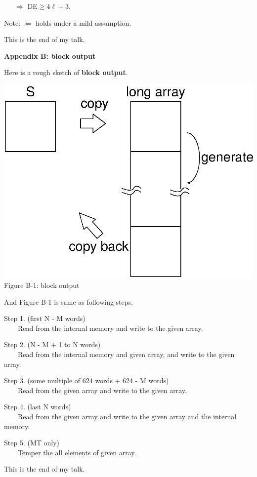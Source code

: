 \documentclass[a4j,12pt,landscape]{jarticle}
\begin{document}
~~~$\Rightarrow$ DE$\geq 4\ell +3$. 

Note: $\Leftarrow$ holds under a mild assumption.

\vskip 1cm
\begin{center}
This is the end of my talk.
\end{center}

\newpage
{\bf Appendix B: block output}

Here is a rough sketch of {\bf block output}.

\begin{center}
\includegraphics[width=0.7\linewidth,height=0.7\textheight,
keepaspectratio]{fill_array.eps}
\\
Figure B-1: block output
\end{center}
\newpage
And Figure B-1 is same as following steps.

Step 1. (first N - M words) \\
~~~~Read from the internal memory and write to the given array.

Step 2. (N - M + 1 to N words) \\
~~~~Read from the internal memory and given array, and 
write to the given array.

Step 3. (some multiple of 624 words + 624 - M words)\\
~~~~Read from the given array and write to the given array.

Step 4. (last N words)\\
~~~~Read from the given array and write to the given array and
 the internal memory.

Step 5. (MT only)\\
~~~~Temper the all elements of given array. 

\vskip 1cm
\begin{center}
This is the end of my talk.
\end{center}
\end{document}
